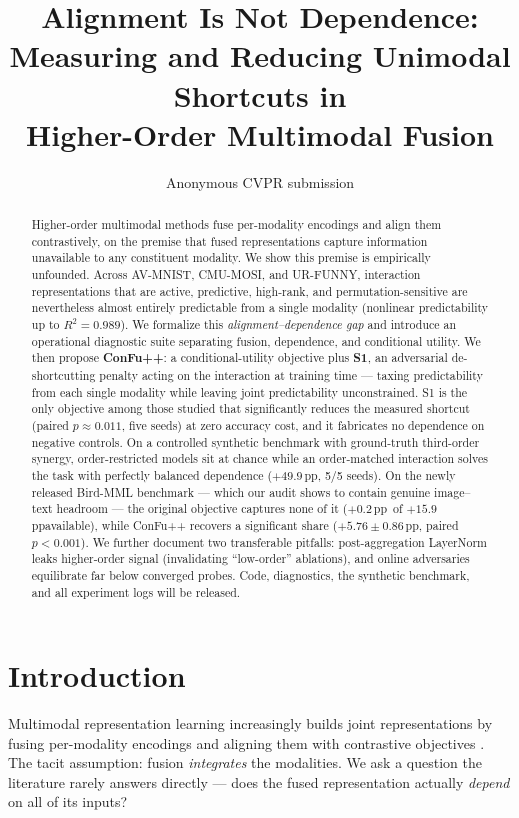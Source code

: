 \documentclass[10pt,twocolumn,letterpaper]{article}
\title{Alignment Is Not Dependence:\\Measuring and Reducing Unimodal Shortcuts in\\Higher-Order Multimodal Fusion}
\author{Anonymous CVPR submission\\
\paperID{\cvprPaperID}}
\newcommand{\pp}{\,pp}
\begin{document}
\maketitle

\begin{abstract}
Higher-order multimodal methods fuse per-modality encodings and align them contrastively, on the
premise that fused representations capture information unavailable to any constituent modality.
We show this premise is empirically unfounded. Across AV-MNIST, CMU-MOSI, and UR-FUNNY,
interaction representations that are active, predictive, high-rank, and permutation-sensitive are
nevertheless almost entirely predictable from a single modality (nonlinear predictability up to
$R^2=0.989$). We formalize this \emph{alignment--dependence gap} and introduce an operational
diagnostic suite separating fusion, dependence, and conditional utility. We then propose
\textbf{ConFu++}: a conditional-utility objective plus \textbf{S1}, an adversarial
de-shortcutting penalty acting on the interaction at training time --- taxing predictability from
each single modality while leaving joint predictability unconstrained. S1 is the only objective
among those studied that significantly reduces the measured shortcut (paired $p\approx0.011$,
five seeds) at zero accuracy cost, and it fabricates no dependence on negative controls. On a
controlled synthetic benchmark with ground-truth third-order synergy, order-restricted models sit
at chance while an order-matched interaction solves the task with perfectly balanced dependence
($+49.9$\pp, 5/5 seeds). On the newly released Bird-MML benchmark --- which our audit shows to
contain genuine image--text headroom --- the original objective captures none of it
($+0.2$\pp\ of $+15.9$\pp available), while ConFu++ recovers a significant share
($+5.76{\pm}0.86$\pp, paired $p<0.001$). We further document two transferable pitfalls:
post-aggregation LayerNorm leaks higher-order signal (invalidating ``low-order'' ablations), and
online adversaries equilibrate far below converged probes. Code, diagnostics, the synthetic
benchmark, and all experiment logs will be released.
\end{abstract}

\section{Introduction}
Multimodal representation learning increasingly builds joint representations by fusing
per-modality encodings and aligning them with contrastive objectives
\cite{clip,symile,imagebind,confu}. The tacit assumption: fusion \emph{integrates} the
modalities. We ask a question the literature rarely answers directly --- does the fused
representation actually \emph{depend} on all of its inputs?
\end{document}
